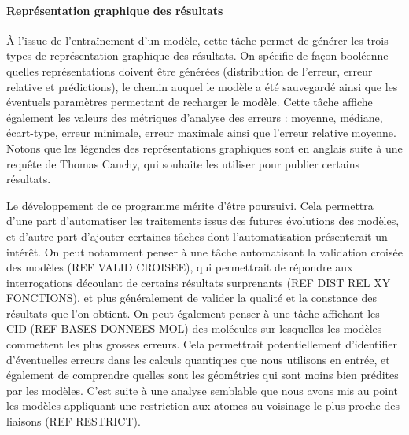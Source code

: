 \paragraph{Représentation graphique des résultats}  À l'issue de l'entraînement d'un modèle, cette tâche permet de générer les trois types de représentation graphique des résultats. On spécifie de façon booléenne quelles représentations doivent être générées (distribution de l'erreur, erreur relative et prédictions), le chemin auquel le modèle a été sauvegardé ainsi que les éventuels paramètres permettant de recharger le modèle. Cette tâche affiche également les valeurs des métriques d'analyse des erreurs : moyenne, médiane, écart-type, erreur minimale, erreur maximale ainsi que l'erreur relative moyenne.\\
Notons que les légendes des représentations graphiques sont en anglais suite à une requête de Thomas Cauchy, qui souhaite les utiliser pour publier certains résultats.\\

\par Le développement de ce programme mérite d'être poursuivi. Cela permettra d'une part d'automatiser les traitements issus des futures évolutions des modèles, et d'autre part d'ajouter certaines tâches dont l'automatisation présenterait un intérêt. On peut notamment penser à une tâche automatisant la validation croisée des modèles (REF VALID CROISEE), qui permettrait de répondre aux interrogations découlant de certains résultats surprenants (REF DIST REL XY FONCTIONS), et plus généralement de valider la qualité et la constance des résultats que l'on obtient. On peut également penser à une tâche affichant les CID (REF BASES DONNEES MOL) des molécules sur lesquelles les modèles commettent les plus grosses erreurs. Cela permettrait potentiellement d'identifier d'éventuelles erreurs dans les calculs quantiques que nous utilisons en entrée, et également de comprendre quelles sont les géométries qui sont moins bien prédites par les modèles. C'est suite à une analyse semblable que nous avons mis au point les modèles appliquant une restriction aux atomes au voisinage le plus proche des liaisons (REF RESTRICT).
